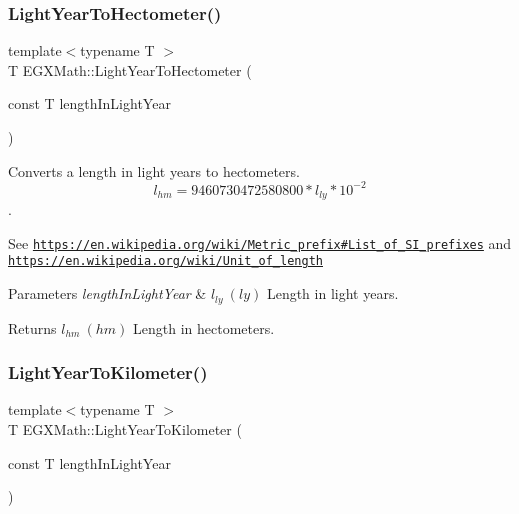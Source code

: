 \subsubsection{\texorpdfstring{Light\+Year\+To\+Hectometer()}{LightYearToHectometer()}}
{\footnotesize\ttfamily template$<$typename T $>$ \\
T E\+G\+X\+Math\+::\+Light\+Year\+To\+Hectometer (\begin{DoxyParamCaption}\item[{const T}]{length\+In\+Light\+Year }\end{DoxyParamCaption})}



Converts a length in light years to hectometers. \[ l_{hm}=9460730472580800 * l_{ly} * 10^{-2} \]. 

See \href{https://en.wikipedia.org/wiki/Metric_prefix#List_of_SI_prefixes}{\tt https\+://en.\+wikipedia.\+org/wiki/\+Metric\+\_\+prefix\#\+List\+\_\+of\+\_\+\+S\+I\+\_\+prefixes} and \href{https://en.wikipedia.org/wiki/Unit_of_length}{\tt https\+://en.\+wikipedia.\+org/wiki/\+Unit\+\_\+of\+\_\+length} 
\begin{DoxyParams}{Parameters}
{\em length\+In\+Light\+Year} & $ l_{ly}\ (ly)$ Length in light years. \\
\hline
\end{DoxyParams}
\begin{DoxyReturn}{Returns}
$ l_{hm}\ (hm)$ Length in hectometers. 
\end{DoxyReturn}
\mbox{\label{group___e_g_x_math-_conversions-_length_conversions-_astronomical-_light_year-_s_i_gae13805b5330d0024a1845884a84fd076}} 
\subsubsection{\texorpdfstring{Light\+Year\+To\+Kilometer()}{LightYearToKilometer()}}
{\footnotesize\ttfamily template$<$typename T $>$ \\
T E\+G\+X\+Math\+::\+Light\+Year\+To\+Kilometer (\begin{DoxyParamCaption}\item[{const T}]{length\+In\+Light\+Year }\end{DoxyParamCaption})}



